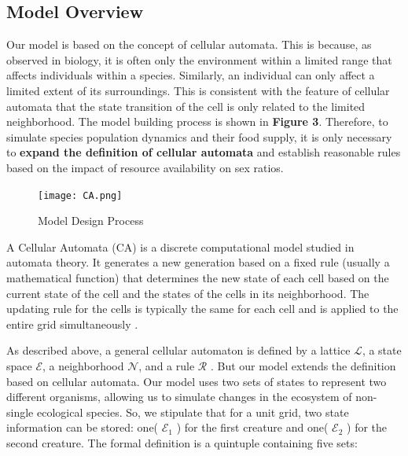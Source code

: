 \documentclass{mcmthesis}
\begin{document}
\subsection{Model Overview}

Our model is based on the concept of cellular automata. This is because, as observed in biology, it is often only the environment within a limited range that affects individuals within a species. Similarly, an individual can only affect a limited extent of its surroundings. This is consistent with the feature of cellular automata that the state transition of the cell is only related to the limited neighborhood. The model building process is shown in \textbf{Figure 3}. Therefore, to simulate species population dynamics and their food supply, it is only necessary to \textbf{expand the definition of cellular automata} and establish reasonable rules based on the impact of resource availability on sex ratios.

\begin{figure}[h]  %
\small
\centering  %
\texttt{[image: CA.png]}  %
\caption{Model Design Process} \label{fig:Model Design Process}  %
\end{figure}  %

A Cellular Automata (CA) is a discrete computational model studied in automata theory. It generates a new generation based on a fixed rule (usually a mathematical function) \cite{3} that determines the new state of each cell based on the current state of the cell and the states of the cells in its neighborhood. The updating rule for the cells is typically the same for each cell and is applied to the entire grid simultaneously \cite{4}. 

As described above, a general cellular automaton is defined by a lattice ${\displaystyle {\mathcal {L}}}$, a state space ${\displaystyle {\mathcal {E}}}$, a neighborhood ${\displaystyle {\mathcal {N}}}$, and a rule ${\displaystyle {\mathcal {R}}}$ \cite{5}. But our model extends the definition based on cellular automata. Our model uses two sets of states to represent two different organisms, allowing us to simulate changes in the ecosystem of non-single ecological species. So, we stipulate that for a unit grid, two state information can be stored: one( ${\displaystyle {\mathcal {E}}}_1$ ) for the first creature and one( ${\displaystyle {\mathcal {E}}}_2$ ) for the second creature. The formal definition is a quintuple containing five sets:
\end{document}

